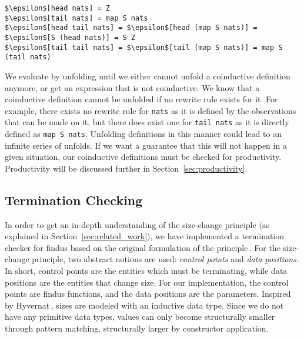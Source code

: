 \begin{Verbatim}[commandchars=\\\{\},codes={\catcode`$=3\catcode`_=8}]
$\epsilon$[head nats] = Z
$\epsilon$[tail nats] = map S nats
$\epsilon$[head tail nats] = $\epsilon$[head (map S nats)] = $\epsilon$[S (head nats)] = S Z
$\epsilon$[tail tail nats] = $\epsilon$[tail (map S nats)] = map S (tail nats)
\end{Verbatim}

We evaluate by unfolding until we either cannot unfold a coinductive definition anymore, or get an expression that is not coinductive. We know that a coinductive definition cannot be unfolded if no rewrite rule exists for it. For example, there exists no rewrite rule for \texttt{nats} as it is defined by the observations that can be made on it, but there does exist one for \texttt{tail nats} as it is directly defined as \texttt{map S nats}. Unfolding definitions in this manner could lead to an infinite series of unfolds. If we want a guarantee that this will not happen in a given situation, our coinductive definitions must be checked for productivity. Productivity will be discussed further in Section~\ref{sec:productivity}. 

\subsection{Termination Checking}
In order to get an in-depth understanding of the size-change principle (as explained in Section~\ref{sec:related_work}), we have implemented a termination checker for findus based on the original formulation of the principle\,\citep{LeeJones01SizeChange}. For the size-change principle, two abstract notions are used: \emph{control points} and \emph{data positions}\,\citep{Krauss07certifiedsizechange}. In short, control points are the entities which must be terminating, while data positions are the entities that change size. For our implementation, the control points are findus functions, and the data positions are the parameters. Inspired by Hyvernat\,\citep{Hyvernat13}, sizes are modeled with an inductive data type. Since we do not have any primitive data types, values can only become structurally smaller through pattern matching, structurally larger by constructor application.

